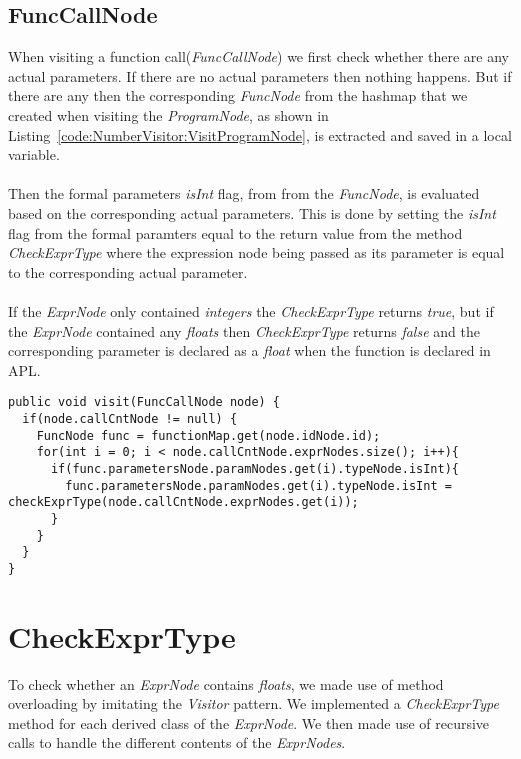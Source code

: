 \subsection{FuncCallNode}
When visiting a function call(\textit{FuncCallNode}) we first check whether there are any actual parameters. If there are no actual parameters then nothing happens. But if there are any then the corresponding \textit{FuncNode} from the hashmap that we created when visiting the \textit{ProgramNode}, as shown in Listing~\ref{code:NumberVisitor:VisitProgramNode}, is extracted and saved in a local variable.
\\\\
Then the formal parameters \textit{isInt} flag, from from the \textit{FuncNode}, is evaluated based on the corresponding actual parameters. This is done by setting the \textit{isInt} flag from the formal paramters equal to the return value from the method \textit{CheckExprType} where the expression node being passed as its parameter is equal to the corresponding actual parameter.
\\\\
If the \textit{ExprNode} only contained \textit{integers} the \textit{CheckExprType} returns \textit{true}, but if the \textit{ExprNode} contained any \textit{floats} then \textit{CheckExprType} returns \textit{false} and the corresponding parameter is declared as a \textit{float} when the function is declared in APL. 
\begin{lstlisting}[caption={code to implement the FuncCallNode visitor}, label={code:NumberVisitor:VisitFuncCallNode}]
public void visit(FuncCallNode node) {
  if(node.callCntNode != null) {
    FuncNode func = functionMap.get(node.idNode.id);
    for(int i = 0; i < node.callCntNode.exprNodes.size(); i++){
      if(func.parametersNode.paramNodes.get(i).typeNode.isInt){
        func.parametersNode.paramNodes.get(i).typeNode.isInt = checkExprType(node.callCntNode.exprNodes.get(i));
      }
    }
  }
}
\end{lstlisting}

\section{CheckExprType}
To check whether an \textit{ExprNode} contains \textit{floats}, we made use of method overloading by imitating the \textit{Visitor} pattern. 
We implemented a \textit{CheckExprType} method for each derived class of the \textit{ExprNode}. 
We then made use of recursive calls to handle the different contents of the \textit{ExprNodes}.

